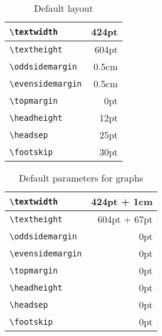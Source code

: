 \documentclass[final]{kuee_en}
\begin{document}
\begin{table}
  \caption{Default layout}\label{tab:text}
  \begin{center}
    \begin{tabular}{|l|r|}
      \hline
      \verb+\textwidth+ & 424pt \\ \hline
      \verb+\textheight+ & 604pt \\ \hline
      \verb+\oddsidemargin+ & 0.5cm \\ \hline
      \verb+\evensidemargin+ & 0.5cm \\ \hline
      \verb+\topmargin+ & 0pt \\ \hline
      \verb+\headheight+ &12pt \\ \hline
      \verb+\headsep+ & 25pt \\ \hline
      \verb+\footskip+ & 30pt \\ \hline
    \end{tabular}
  \end{center}
\end{table}

\begin{table}
  \caption{Default parameters for graphs}\label{tab:fig}
  \begin{center}
    \begin{tabular}{|l|r|}
      \hline
      \verb+\textwidth+ & 424pt + 1cm \\ \hline
      \verb+\textheight+ & 604pt + 67pt \\ \hline
      \verb+\oddsidemargin+ & 0pt \\ \hline
      \verb+\evensidemargin+ & 0pt \\ \hline
      \verb+\topmargin+ & 0pt \\ \hline
      \verb+\headheight+ & 0pt \\ \hline
      \verb+\headsep+ & 0pt \\ \hline
      \verb+\footskip+ & 0pt \\ \hline
    \end{tabular}
  \end{center}
\end{table}
\end{document}
